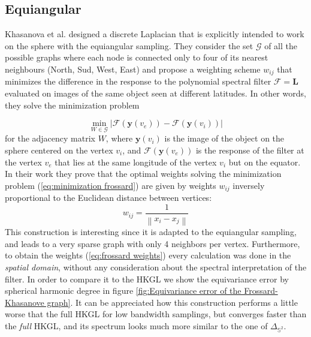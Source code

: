 \documentclass{article} %
\newcommand{\norm}[1]{\left\lVert#1\right\rVert}
\begin{document}
\subsection{Equiangular}
Khasanova et al. \cite{Frossard2017GraphBasedCO} designed a discrete Laplacian that is explicitly intended to work on the sphere with the equiangular sampling. They consider the set $\mathcal G$ of all the possible graphs where each node is connected only to four of its nearest neighbours (North, Sud, West, East) and propose a weighting scheme $w_{ij}$ that minimizes the difference in the response to the polynomial spectral filter $\mathcal F = \mathbf L$ evaluated on images of the same object seen at different latitudes. In other words, they solve the minimization problem

\begin{equation}\label{eq:minimization frossard}
	\min_{W\in\mathcal G} \left|\mathcal{F}\left(\mathbf{y}\left(v_{ e}\right)\right)-\mathcal{F}\left(\mathbf{y}\left(v_{ i}\right)\right)\right|
\end{equation}
for the adjacency matrix $W$, where $\mathbf y(v_i)$ is the image of the object on the sphere centered on the vertex $v_i$, and $\mathcal F (\mathbf y(v_e))$ is the response of the filter at the vertex $v_e$ that lies at the same longitude of the vertex $v_i$ but on the equator. In their work they prove that the optimal weights solving the minimization problem (\ref{eq:minimization frossard}) are given by weights $w_{ij}$ inversely proportional to the Euclidean distance between vertices:
\begin{equation}\label{eq:frossard weights}
	w_{ij} = \frac{1}{\norm{x_i-x_j}}
\end{equation}
This construction is interesting since it is adapted to the equiangular sampling, and leads to a very sparse graph with only 4 neighbors per vertex. Furthermore, to obtain the weights (\ref{eq:frossard weights}) every calculation was done in the \textit{spatial domain}, without any consideration about the spectral interpretation of the filter. In order to compare it to the HKGL we show the equivariance error by spherical harmonic degree in figure \ref{fig:Equivariance error of the Frossard-Khasanove graph}. It can be appreciated how this construction performs a little worse that the full HKGL for low bandwidth samplings, but converges faster than the \textit{full} HKGL, and its spectrum looks much more similar to the one of $\Delta_{\mathbb S^2}$.
\end{document}
